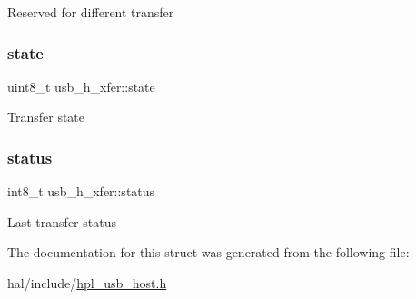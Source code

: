 Reserved for different transfer \mbox{\label{structusb__h__xfer_a6beff3569ca236c435297860e7d73865}} 
\subsubsection{\texorpdfstring{state}{state}}
{\footnotesize\ttfamily uint8\+\_\+t usb\+\_\+h\+\_\+xfer\+::state}

Transfer state \mbox{\label{structusb__h__xfer_ada2ac9bb01c2a37045d9b69c3762e02c}} 
\subsubsection{\texorpdfstring{status}{status}}
{\footnotesize\ttfamily int8\+\_\+t usb\+\_\+h\+\_\+xfer\+::status}

Last transfer status 

The documentation for this struct was generated from the following file\+:\begin{DoxyCompactItemize}
\item 
hal/include/\hyperlink{hpl__usb__host_8h}{hpl\+\_\+usb\+\_\+host.\+h}\end{DoxyCompactItemize}
